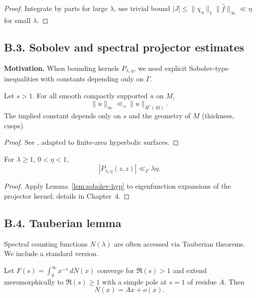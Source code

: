 \begin{proof}
Integrate by parts for large $\lambda$, use trivial bound $|J|\le \|\chi_\eta\|_1\|\hat{f}\|_\infty \ll \eta$ for small $\lambda$.
\end{proof}

\subsection*{B.3. Sobolev and spectral projector estimates}

\noindent
\textbf{Motivation.}
When bounding kernels $P_{\lambda,\eta}$, we need explicit Sobolev-type
inequalities with constants depending only on $\Gamma$.

\begin{lemma}\label{lem:sobolev-hyp}
Let $s>1$. For all smooth compactly supported $u$ on $M$,
\[
\|u\|_\infty \ll_s \|u\|_{H^s(M)}.
\]
The implied constant depends only on $s$ and the geometry of $M$ (thickness,
cusps).
\end{lemma}

\begin{proof}
See \cite[Thm.~2.1]{Iwaniec2002}, adapted to finite-area hyperbolic surfaces.
\end{proof}

\begin{corollary}\label{cor:proj-bound}
For $\lambda\ge 1$, $0<\eta<1$,
\[
|P_{\lambda,\eta}(z,z)| \ll_\Gamma \lambda \eta.
\]
\end{corollary}

\begin{proof}
Apply Lemma~\ref{lem:sobolev-hyp} to eigenfunction expansions of the projector
kernel; details in Chapter~4.
\end{proof}

\subsection*{B.4. Tauberian lemma}

\noindent
Spectral counting functions $N(\lambda)$ are often accessed via Tauberian
theorems. We include a standard version.

\begin{lemma}\label{lem:tauber}
Let $F(s)=\int_0^\infty x^{-s}\,dN(x)$ converge for $\Re(s)>1$ and extend
meromorphically to $\Re(s)\ge 1$ with a simple pole at $s=1$ of residue $A$.
Then
\[
N(x) = Ax + o(x).
\]
\end{lemma}

